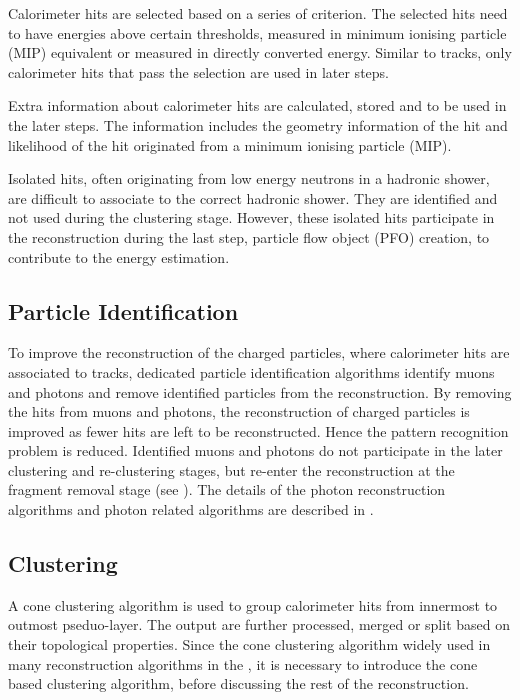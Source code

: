 Calorimeter hits are selected based on a series of criterion. The selected hits need to have energies above certain thresholds, measured in minimum ionising particle (MIP) equivalent or measured in directly converted energy. Similar to tracks, only calorimeter hits that pass the selection are used in later steps.

Extra information about calorimeter hits are calculated, stored and to be used in the later steps. The information includes the geometry information of the hit and likelihood of the hit originated from a minimum ionising particle (MIP).

Isolated hits, often originating from low energy neutrons in a hadronic shower, are difficult to associate to the correct hadronic shower. They are identified and not used during the clustering stage. However, these isolated hits participate in the reconstruction during the  last step, particle flow object (PFO) creation, to contribute to the energy estimation.


\subsection{Particle Identification}
\label{sec:particleID}

To improve the reconstruction of the charged particles, where calorimeter hits are associated to tracks, dedicated particle identification algorithms identify muons and photons and remove identified particles from the reconstruction. By removing the hits from muons and photons, the reconstruction of charged particles is improved as fewer hits are left to be reconstructed. Hence the pattern recognition problem is reduced. Identified muons and photons do not participate in the later clustering and re-clustering stages, but re-enter the reconstruction at the fragment removal stage (see ). The details of the photon reconstruction algorithms and photon related algorithms are described in .


\subsection{Clustering}
\label{sec:pandoraConeCluster}

A cone clustering algorithm is used to group calorimeter hits from innermost to outmost pseduo-layer. The output \clusters are further processed, merged or split based on their topological properties. Since the cone clustering algorithm widely used in many reconstruction algorithms in the \pandora, it is necessary to introduce the cone based clustering algorithm, before discussing the rest of the \pandora reconstruction.



